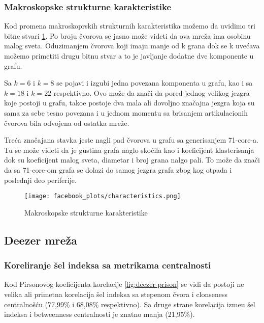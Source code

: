 \documentclass[11pt,a4paper]{article}
\begin{document}
\subsubsection{Makroskopske strukturne karakteristike}

Kod promena makroskoprskih strukturnih karakteristika mo\v zemo da uvidimo tri bitne stvari \ref{fig:facebook-karakteristike}. Po broju \v cvorova se jasno mo\v ze videti da ova mre\v za ima osobinu malog sveta. Oduzimanjem \v cvorova koji imaju manje od k grana dok se k uve\' cava mo\v zemo primetiti drugu bitnu stvar a to je javljanje dodatne dve komponente u grafu.

Sa $ k = 6 $ i $ k = 8 $ se pojavi i izgubi jedna povezana komponenta u grafu, kao i sa $ k = 18 $ i $ k = 22 $ respektivno. Ovo mo\v ze da zna\v ci da pored jednog velikog jezgra koje postoji u grafu, tako\dj e postoje dva mala ali dovoljno zna\v cajna jezgra koja su sama za sebe tesno povezana i u jednom momentu sa brisanjem artikulacionih \v cvorova bila odvojena od ostatka mre\v ze.

Tre\' ca zna\v cajana stavka jeste nagli pad \v cvorova u grafu sa generisanjem 71-core-a. Tu se mo\v ze videti da je gustina grafa naglo sko\v cila kao i koeficijent klasterisanja dok su koeficijent malog sveta, diametar i broj grana nalgo pali. To mo\v ze da zna\v ci da sa 71-core-om grafa se dolazi do samog jezgra grafa zbog kog otpada i poslednji deo periferije.

\begin{figure}
    \centering
    \texttt{[image: facebook\_plots/characteristics.png]}
    \caption{Makroskopske strukturne karakteristike}
    \label{fig:facebook-karakteristike}
\end{figure}

\newpage

\subsection{Deezer mre\v za}

\subsubsection{Koreliranje \v sel indeksa sa metrikama centralnosti}

Kod Pirsonovog koeficijenta korelacije \ref{fig:deezer-prison} se vidi da postoji ne velika ali primetna korelacija \v sel indeksa sa stepenom \v cvora i clonseness centralno\v s\' cu (77,99\% i 68,08\% respektivno). Sa druge strane korelacija izme\dj u \v sel indeksa i betweenness centralnosti je znatno manja (21,95\%).
\end{document}

